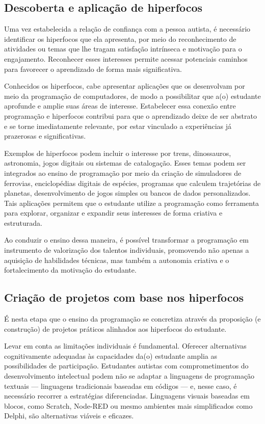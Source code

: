 \documentclass[
  12pt,
  a4paper,
]{article}
\begin{document}
\hypertarget{subsec:descoberta}{%
\subsection{Descoberta e aplicação de
hiperfocos}\label{subsec:descoberta}}

Uma vez estabelecida a relação de confiança com a pessoa autista, é
necessário identificar os hiperfocos que ela apresenta, por meio do
reconhecimento de atividades ou temas que lhe tragam satisfação
intrínseca e motivação para o engajamento. Reconhecer esses interesses
permite acessar potenciais caminhos para favorecer o aprendizado de
forma mais significativa.

Conhecidos os hiperfocos, cabe apresentar aplicações que os desenvolvam
por meio da programação de computadores, de modo a possibilitar que a(o)
estudante aprofunde e amplie suas áreas de interesse. Estabelecer essa
conexão entre programação e hiperfocos contribui para que o aprendizado
deixe de ser abstrato e se torne imediatamente relevante, por estar
vinculado a experiências já prazerosas e significativas.

Exemplos de hiperfocos podem incluir o interesse por trens, dinossauros,
astronomia, jogos digitais ou sistemas de catalogação. Esses temas podem
ser integrados ao ensino de programação por meio da criação de
simuladores de ferrovias, enciclopédias digitais de espécies, programas
que calculem trajetórias de planetas, desenvolvimento de jogos simples
ou bancos de dados personalizados. Tais aplicações permitem que o
estudante utilize a programação como ferramenta para explorar, organizar
e expandir seus interesses de forma criativa e estruturada.

Ao conduzir o ensino dessa maneira, é possível transformar a programação
em instrumento de valorização dos talentos individuais, promovendo não
apenas a aquisição de habilidades técnicas, mas também a autonomia
criativa e o fortalecimento da motivação do estudante.

\hypertarget{subsec:criacao}{%
\subsection{Criação de projetos com base nos
hiperfocos}\label{subsec:criacao}}

É nesta etapa que o ensino da programação se concretiza através da
proposição (e construção) de projetos práticos alinhados aos hiperfocos
do estudante.

Levar em conta as limitações individuais é fundamental. Oferecer
alternativas cognitivamente adequadas às capacidades da(o) estudante
amplia as possibilidades de participação. Estudantes autistas com
comprometimentos do desenvolvimento intelectual podem não se adaptar a
linguagens de programação textuais --- linguagens tradicionais baseadas
em códigos --- e, nesse caso, é necessário recorrer a estratégias
diferenciadas. Linguagens visuais baseadas em blocos, como Scratch,
Node-RED ou mesmo ambientes mais simplificados como Delphi, são
alternativas viáveis e eficazes.
\end{document}
